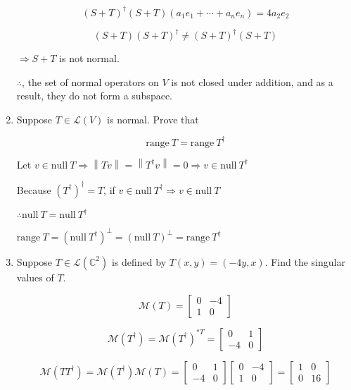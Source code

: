 \documentclass[fleqn]{article}
\makeatletter
\newcommand{\norm}[1]{\left \lVert #1 \right \rVert}
\newenvironment{equationCenter}{\@fleqnfalse\begin{equation*}}{\end{equation*}}
\makeatother
\begin{document}
\begin{enumerate}[nolistsep]
		\begin{equation*}
			(S + T)^{\dag}(S + T)(a_1e_1 + \cdots + a_ne_n) = 4a_2e_2
		\end{equation*}
		
		\begin{equation*}
			(S + T)(S + T)^{\dag} \neq (S + T)^{\dag}(S + T)
		\end{equation*}
		
		$\Rightarrow S + T$ is not normal.
		
		$\therefore$, the set of normal operators on $V$ is not closed under addition, and as a result, they do not form a subspace.
		
		\item Suppose $T \in \mathcal{L}(V)$ is normal. Prove that
		
			\begin{equationCenter}
				\text{range}\ T = \text{range}\ T^{\dag}
			\end{equationCenter}
			
			Let $v \in \text{null}\ T \Rightarrow \norm{Tv} = \norm{T^{\dag}v} = 0 \Rightarrow v \in \text{null}\ T^{\dag}$
			
			Because $(T^{\dag})^{\dag} = T$, if $v \in \text{null}\ T^{\dag} \Rightarrow v \in \text{null}\ T$
			
			$\therefore \text{null}\ T = \text{null}\ T^{\dag}$
			
			$\text{range}\ T = (\text{null}\ T^{\dag})^{\perp} = (\text{null}\ T)^{\perp} = \text{range}\ T^{\dag}$
			
		\item Suppose $T \in \mathcal{L}(\mathbb{C}^2)$ is defined by $T(x,y) = (-4y, x)$. Find the singular values of $T$.
		
		\begin{equation*}
			\mathcal{M}(T) = \begin{bmatrix}
				0 & -4\\
				1 & 0
			\end{bmatrix}
		\end{equation*}
		
		\begin{equation*}
			\mathcal{M}(T^{\dag}) = \mathcal{M}(T^{\dag})^{*T} = \begin{bmatrix}
				0 & 1\\
				-4 & 0
			\end{bmatrix}
		\end{equation*}
		
		\begin{equation*}
			\mathcal{M}(TT^{\dag}) = \mathcal{M}(T^{\dag})\mathcal{M}(T) = \begin{bmatrix}
				0 & 1\\
				-4 & 0
			\end{bmatrix}\begin{bmatrix}
				0 & -4\\
				1 & 0
			\end{bmatrix} = \begin{bmatrix}
				1 & 0\\
				0 & 16
			\end{bmatrix}
		\end{equation*}
		

\end{enumerate}
\end{document}
